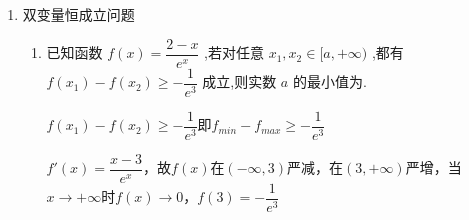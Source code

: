 \begin{enumerate}
\begin{enumerate}
\begin{jieda}
\begin{enumerate}
\begin{dingautolist}{172}
                    又因为$g(0) = 0$，所以$g(x)$在$(0, x_0)$严增，在$(x_0, +\infty)$严减，由二次函数和对数函数性质可知$x \rightarrow +\infty$时$g(x) < 0$，故$g(x)$在$(0, +\infty)$存在唯一变号零点$x_1$


                    故$f'(x)$在$(0, +\infty)$上存在变号零点
                \end{dingautolist}
                因此$a \in \left(0, \dfrac{1}{2}\right)$满足要求

                \item 方法2 参变分离

                将方程变形为$a = \dfrac{(x+1)ln(x+1)-x}{x^2}$，设$g(x) = \dfrac{(x+1)ln(x+1)-x}{x^2}$，则$g'(x) = \dfrac{x^2ln(x+1)-2x[(x+1)ln(x+1)-x]}{x^4} = \dfrac{(-x^2-2x)ln(x+1)+2x^2}{x^4} = \dfrac{(-x-2)ln(x+1)+2x}{x^3}$

                设$h(x) = (-x-2)ln(x+1)+2x$，则$h'(x) = -ln(x+1)-\dfrac{x+2}{x+1}+2 = \dfrac{x}{x+1}-ln(x+1)$，$h''(x) = \dfrac{1}{(x+1)^2}-\dfrac{1}{x+1} < 0$，故$h'(x) < h'(0) = 0$，故$h(x) < h(0) = 0$，故$g'(x) < 0$，故$g(x)$在$(0, + \infty)$严减

                根据洛必达法则可得$x \rightarrow 0$时$g(x) \rightarrow \dfrac{1}{2}$，因此$a \in \left(0, \dfrac{1}{2}\right)$
            \end{enumerate}
        \end{jieda}
    \end{enumerate}

    \item 双变量恒成立问题
    \begin{enumerate}
        \item 已知函数 $f\left( x\right)  = \dfrac{2 - x}{{e}^{x}}$ ,若对任意 ${x}_{1},{x}_{2} \in  \lbrack a, + \infty )$ ,都有 $f\left( {x}_{1}\right)  - f\left( {x}_{2}\right)  \geq   - \dfrac{1}{{e}^{3}}$ 成立,则实数 $a$ 的最小值为.
        \begin{jieda}
            $f\left( {x}_{1}\right)  - f\left( {x}_{2}\right)  \geq   - \dfrac{1}{{e}^{3}}$即$f_{min} - f_{max} \geq -\dfrac{1}{e^3}$
        
            $f'(x) = \dfrac{x-3}{e^x}$，故$f(x)$在$(-\infty, 3)$严减，在$(3, +\infty)$严增，当$x \rightarrow +\infty$时$f(x) \rightarrow 0$，$f(3) = -\dfrac{1}{e^3}$


\end{jieda}
\end{enumerate}
\end{enumerate}
